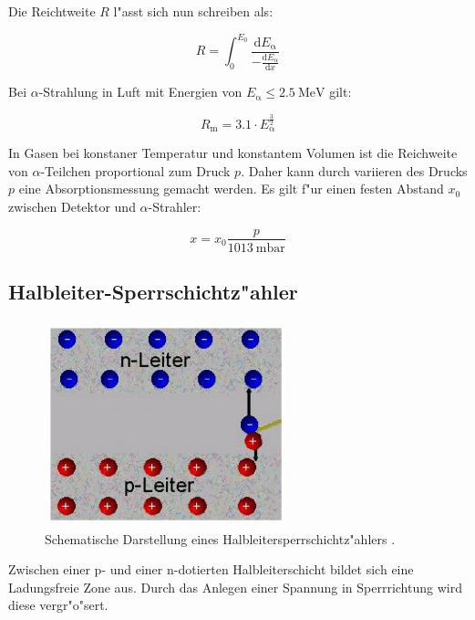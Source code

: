 Die Reichtweite $R$ l"asst sich nun schreiben als:

\begin{equation}
	R = \int_0^{E_\mathrm{0}} \frac{\mathrm{d}E_\mathrm{\alpha}}{- \frac{\mathrm{d}E_\mathrm{\alpha}}{\mathrm{d}x}}
\end{equation}

Bei $\alpha$-Strahlung in Luft mit Energien von $E_\mathrm{\alpha} \leq \SI{2.5}{\mega\electronvolt}$ gilt:

\begin{equation}
	R_\mathrm{m} = 3.1 \cdot E_\mathrm{\alpha}^\frac{3}{2}
\end{equation}

In Gasen bei konstaner Temperatur und konstantem Volumen ist die Reichweite von $\alpha$-Teilchen proportional zum Druck $p$. Daher kann durch variieren des Drucks $p$ eine Absorptionsmessung gemacht werden. Es gilt f"ur einen festen Abstand $x_\mathrm{0}$ zwischen Detektor und $\alpha$-Strahler:

\begin{equation}
	x = x_\mathrm{0} \frac{p}{\SI{1013}{\milli\bar}}
\end{equation}
\clearpage
\subsection{Halbleiter-Sperrschichtz"ahler} %
\label{sub:halbleiter_sperrschichtz_ahler}


\begin{figure}
	\centering
	\includegraphics[width = 7cm]{img/pn.JPG}
	\caption{Schematische Darstellung eines Halbleitersperrschichtz"ahlers \cite{pn}.}
	\label{fig:pn}
\end{figure}

Zwischen einer p- und einer n-dotierten Halbleiterschicht bildet sich eine Ladungsfreie Zone aus. Durch das Anlegen einer Spannung in Sperrrichtung wird diese vergr"o"sert.

